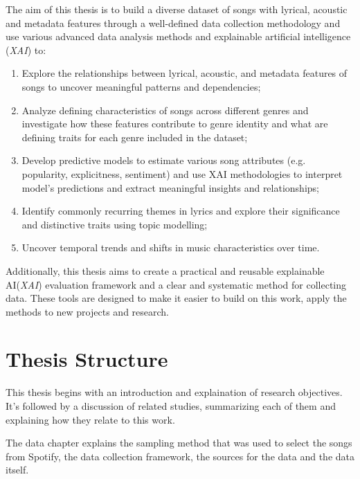 The aim of this thesis is to build a diverse dataset of songs with lyrical,
acoustic and metadata features through a well-defined data collection
methodology and use various advanced data analysis methods and explainable
artificial intelligence (\textit{XAI}) to:

\begin{enumerate}
  \item Explore the relationships between lyrical, acoustic, and metadata
    features of songs to uncover meaningful patterns and dependencies;
  \item Analyze defining characteristics of songs across different genres and
    investigate how these features contribute to genre identity and what are
    defining traits for each genre included in the dataset;
  \item Develop predictive models to estimate various song attributes (e.g.
    popularity, explicitness, sentiment) and use XAI methodologies to interpret
    model's predictions and extract meaningful insights and relationships;
  \item Identify commonly recurring themes in lyrics and explore their
    significance and distinctive traits using topic modelling;
  \item Uncover temporal trends and shifts in music characteristics over time.
\end{enumerate}

Additionally, this thesis aims to create a practical and reusable explainable
AI(\textit{XAI}) evaluation framework and a clear and systematic method for
collecting data. These tools are designed to make it easier to build on this
work, apply the methods to new projects and research.




\section{Thesis Structure}
\label{sec:thesisstructure}

This thesis begins with an introduction and explaination of research objectives.
It's followed by a discussion of related studies, summarizing each of them and
explaining how  they relate to this work. 

The data chapter explains the sampling method that was used to select the songs
from Spotify, the data collection framework, the sources for the data and the
data itself.

